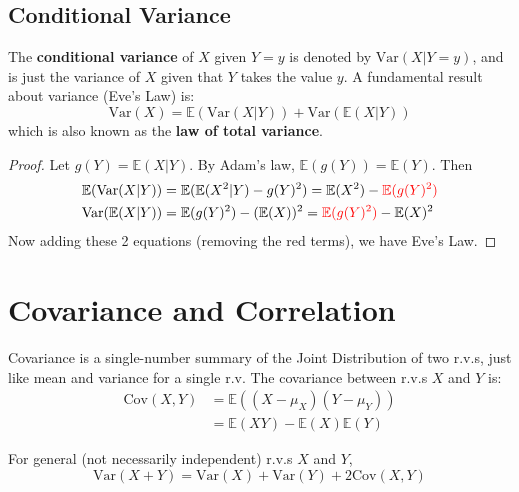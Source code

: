 \documentclass{article}
\begin{document}
\subsection{Conditional Variance}

\begin{definition}
    The \textbf{conditional variance} of $X$ given $Y = y$ is denoted by $\text{Var}(X | Y = y)$, and is just the variance of $X$ given that $Y$ takes the value $y$. A fundamental result about variance (Eve's Law) is: \begin{equation}
        \text{Var}(X) = \mathbb{E}(\text{Var} (X | Y)) + \text{Var}(\mathbb{E}(X | Y))
    \end{equation}
    \noindent which is also known as the \textbf{law of total variance}. 
\end{definition} 

\begin{proof}
    Let $g(Y) = \mathbb{E}(X | Y)$. By Adam's law, $ \mathbb{E}(g(Y)) = \mathbb{E}(Y)$. Then \begin{align*}
        \mathbb{E}(\text{Var}(X|Y)) &= \mathbb{E}(\mathbb{E}(X^{2}|Y) - g(Y)^{2}) = \mathbb{E}(X^{2}) - \textcolor{red}{\mathbb{E}(g(Y)^{2})} \\ 
        \text{Var}(\mathbb{E}(X | Y)) &= \mathbb{E}(g(Y)^{2}) - (\mathbb{E}(X))^{2} = \textcolor{red}{\mathbb{E}(g(Y)^{2})} - \mathbb{E}(X)^{2} 
    \end{align*}
    \noindent Now adding these 2 equations (removing the red terms), we have Eve's Law. 
\end{proof}

\section{Covariance and Correlation}

Covariance is a single-number summary of the Joint Distribution of two r.v.s, just like mean and variance for a single r.v. The covariance between r.v.s $X$ and $Y$ is: \begin{align*}
    \text{Cov} (X, Y) &= \mathbb{E} ((X - \mu_X)(Y - \mu_Y)) \\ 
    &= \mathbb{E}(XY) - \mathbb{E}(X)\mathbb{E}(Y)
\end{align*}

\noindent For general (not necessarily independent) r.v.s $X$ and $Y$, \begin{equation}
    \text{Var}(X+Y) = \text{Var}(X) + \text{Var}(Y) + 2 \text{Cov}(X,Y)
\end{equation}
\end{document}
